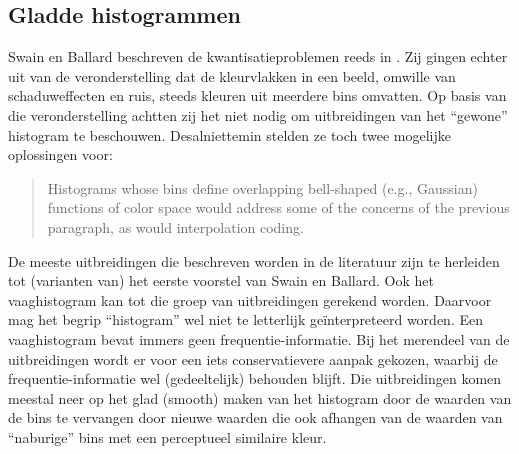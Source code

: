 \subsection{Gladde histogrammen}

Swain en Ballard beschreven de kwantisatieproblemen reeds in \cite{swain:color_indexing}.
Zij gingen echter uit van de veronderstelling dat de kleurvlakken in een beeld,
omwille van schaduweffecten en ruis,
steeds kleuren uit meerdere bins omvatten. Op basis van die veronderstelling achtten zij
het niet nodig om uitbreidingen van het ``gewone'' histogram te beschouwen.
Desalniettemin stelden ze toch twee mogelijke oplossingen voor:
\begin{quote}
Histograms whose bins define overlapping bell-shaped (e.g., Gaussian) functions
of color space would address some of the concerns of the previous paragraph, as
would interpolation coding.
\end{quote}
De meeste uitbreidingen die beschreven worden in de literatuur 
\cite{jawahar:fuzzy_statistics_of_digital_images,
lu:perceptually_weighted_histograms_for_ir,
sural:perceptually_smooth_histogram,
vertan:embedding_fuzzy_logic_in_cbir, vertan:fuzzy_histograms} zijn
te herleiden tot (varianten van) het eerste voorstel van Swain en Ballard. Ook het
vaaghistogram kan tot die groep van uitbreidingen gerekend worden. Daarvoor mag het
begrip ``histogram'' wel niet te letterlijk ge\"interpreteerd worden. Een vaaghistogram
bevat immers geen frequentie-informatie. Bij het merendeel van de uitbreidingen wordt
er voor een iets conservatievere aanpak gekozen, waarbij de frequentie-informatie wel (gedeeltelijk)
behouden blijft. Die uitbreidingen komen meestal neer op het glad (smooth) maken van 
het histogram door de waarden van de bins te vervangen door nieuwe waarden die ook 
afhangen van de waarden van ``naburige'' bins met een perceptueel similaire kleur. 
 
